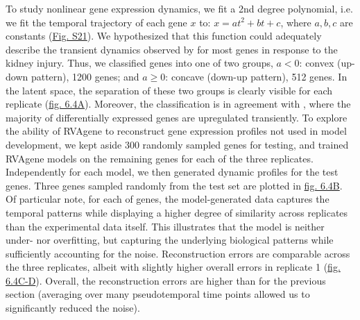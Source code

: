 \par
To study nonlinear gene expression dynamics, we fit a 2nd degree polynomial, i.e. we fit the temporal trajectory of each gene $x$ to:  $x = at^2 + bt + c$, where $a,b,c$ are constants (\hyperref[fig:figS6]{Fig. S21}). We hypothesized that this function could adequately describe the transient dynamics observed by \citet{liu2017molecular} for most genes in response to the kidney injury. 
Thus, we classified genes into one of two groups, $a < 0$: convex (up-down pattern), 1200 genes; and
$a \geq 0$: concave (down-up pattern), 512 genes. In the latent space, the separation of these two
groups is clearly visible for each replicate (\hyperref[fig:fig6a]{fig. 6.4A}). Moreover, the classification is in agreement with \citet{liu2017molecular}, where the majority of differentially expressed genes are upregulated transiently. 
To explore the ability of RVAgene to reconstruct gene expression profiles not used in model
development, we kept aside 300 randomly sampled genes for testing, and trained RVAgene models on the
remaining genes for each of the three replicates. Independently for each model, we then generated
dynamic profiles for the test genes. Three genes sampled randomly from the test set are plotted in
\hyperref[fig:fig6a]{fig. 6.4B}. Of particular note, for each of genes, the model-generated data captures the temporal patterns while displaying a higher degree of similarity across replicates than the experimental data itself. This illustrates that the model is neither under- nor overfitting, but capturing the underlying biological patterns while sufficiently accounting for the noise. 
Reconstruction errors are comparable across the three replicates, albeit with slightly higher
overall errors in replicate 1 (\hyperref[fig:fig6a]{fig. 6.4C-D}). Overall, the reconstruction errors are higher than for the previous section (averaging over many pseudotemporal time points allowed us to significantly reduced the noise). 



